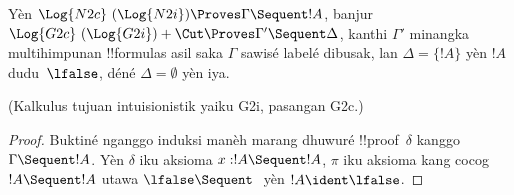 \documentclass[../../../include/open-logic-section]{subfiles}
\begin{document}


\begin{prop} Yèn $\Log{N2c}\ (\Log{N2i}) \Proves
\Gamma \Sequent !A$, banjur $\Log{G2c}\ (\Log{G2i}) + \Cut \Proves \Gamma'
\Sequent \Delta$, kanthi $\Gamma'$ minangka multihimpunan !!{formula}s
asil saka $\Gamma$ sawisé labelé dibusak, lan $\Delta = \{!A\}$
yèn $!A$ dudu~$\lfalse$, déné $\Delta = \emptyset$ yèn iya.
\end{prop}
(Kalkulus tujuan intuisionistik yaiku G2i, pasangan G2c.)

\begin{proof}
Buktiné nganggo induksi manèh marang dhuwuré
!!{proof}~$\delta$ kanggo $\Gamma \Sequent !A$.
Yèn $\delta$ iku aksioma $x:!A \Sequent !A$,
$\pi$ iku aksioma kang cocog $!A \Sequent !A$
utawa $\lfalse \Sequent \ $ yèn $!A \ident \lfalse$.


\end{proof}
\end{document}
